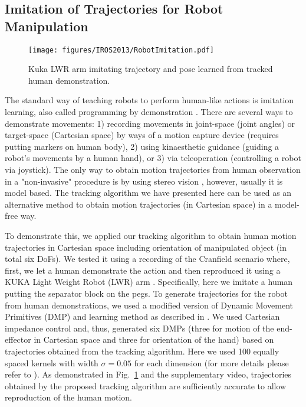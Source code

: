 \subsection{Imitation of Trajectories for Robot Manipulation}
\begin{figure}[!tb]
  \centering
  \texttt{[image: figures/IROS2013/RobotImitation.pdf]}
  \caption[Trajectory Imitation]{Kuka LWR arm imitating trajectory and pose learned from tracked human demonstration.}
  \label{fig:Imitation}
\end{figure}
The standard way of teaching robots to perform human-like actions is imitation learning, also called programming by demonstration \cite{Billard2008,Argall2009}. There are several ways to demonstrate movements: 1) recording movements in joint-space (joint angles) or target-space (Cartesian space) by ways of a motion capture device (requires putting markers on human body), 2) using kinaesthetic guidance (guiding a robot's movements by a human hand), or 3) via teleoperation (controlling a robot via joystick). The only way to obtain motion trajectories from human observation in a "non-invasive" procedure is by using stereo vision \cite{Hecht2009}, however, usually it is model based. The tracking algorithm we have presented here can be used as an alternative method to obtain motion trajectories (in Cartesian space) in a model-free way. 

To demonstrate this, we applied our tracking algorithm to obtain human motion trajectories in Cartesian space including orientation of manipulated object (in total six DoFs). We tested it using a recording of the Cranfield scenario where, first, we let a human demonstrate the action and then reproduced it using a KUKA Light Weight Robot (LWR) arm \cite{kuka}. Specifically, here we imitate a human putting the separator block on the pegs. To generate trajectories for the robot from human demonstrations, we used a modified version of Dynamic Movement Primitives \cite{Ijspeert2002,Ijspeert2013} (DMP) and learning method as described in \cite{Kulvicius2012}. We used Cartesian impedance control and, thus, generated six DMPs (three for motion of the end-effector in Cartesian space and three for orientation of the hand) based on trajectories obtained from the tracking algorithm. Here we used 100 equally spaced kernels with width $\sigma=0.05$ for each dimension (for more details please refer to \cite{Kulvicius2012}).
 As demonstrated in Fig.~\ref{fig:Imitation} and the supplementary video, trajectories obtained by the proposed tracking algorithm are sufficiently accurate to allow reproduction of the human motion.


